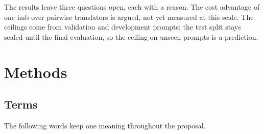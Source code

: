 The results leave three questions open, each with a reason.  The cost advantage of one hub over pairwise translators is argued, not yet measured at this scale. 
 The ceilings come from validation and development prompts; the test split stays sealed until the final evaluation, so the ceiling on unseen prompts is a prediction. 

\section{Methods}\label{sec:hub:methods}

\subsection{Terms}\label{sec:hub:terms}

The following words keep one meaning throughout the proposal.

